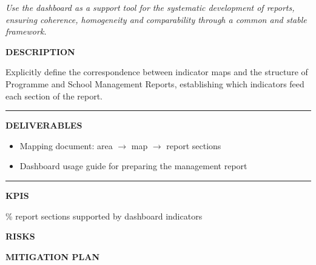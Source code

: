 \documentclass[11pt,a4paper]{scrreprt}
\newcommand{\fieldlabel}[1]{%
  {\footnotesize\sffamily\bfseries\color{mutedcolor}\MakeUppercase{#1}}\par\nopagebreak[4]
}
\newcommand{\fieldsep}{\vspace{3pt}\noindent\textcolor{bordercolor}{\rule{\linewidth}{0.4pt}}\vspace{3pt}\par}
\begin{document}
\newpage
{}
{\small\color{mutedcolor}\itshape Use the dashboard as a support tool for the systematic development of reports, ensuring coherence, homogeneity and comparability through a common and stable framework.}\par\vspace{6pt}

\begin{tcolorbox}[pabox={dashcolor}{A.P.4.1 \enspace\textbullet\enspace Alignment of Indicator Maps with the Structure of Management Reports}]

\fieldlabel{Description}
{\small Explicitly define the correspondence between indicator maps and the structure of Programme and School Management Reports, establishing which indicators feed each section of the report.}\par
\fieldsep
\fieldlabel{Deliverables}
{\small \begin{itemize}[noitemsep,topsep=2pt]
\item Mapping document: area $\rightarrow$ map $\rightarrow$ report sections
\item Dashboard usage guide for preparing the management report
\end{itemize}}\par
\fieldsep
\fieldlabel{KPIs}
{\small \% report sections supported by dashboard indicators}\par
\end{tcolorbox}
\begin{tcolorbox}[riskbox]
{\footnotesize\sffamily\bfseries\color{red!50!black} RISKS}\par{}
\end{tcolorbox}
\begin{tcolorbox}[mitbox]
{\footnotesize\sffamily\bfseries\color{green!40!black} MITIGATION PLAN}\par{}
\end{tcolorbox}
\vspace{8pt}
\end{document}
